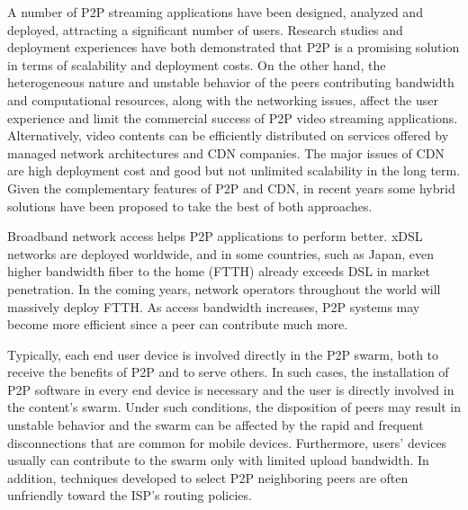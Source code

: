 \documentclass[conference]{IEEEtran}
\begin{document}
A number of P2P streaming applications have been designed, analyzed and deployed, attracting a significant number of users.  
Research studies and deployment experiences have both demonstrated that P2P is a promising solution in terms of scalability and deployment costs.  
On the other hand, the heterogeneous nature and unstable behavior of the peers contributing bandwidth and computational resources, along with the networking issues, affect the user experience and limit the commercial success of P2P video streaming applications.
Alternatively, video contents can be efficiently distributed on services offered by managed network architectures and CDN companies.
The major issues of CDN are high deployment cost and good but not unlimited scalability in the long term.  
Given the complementary features of P2P and CDN, in recent years some hybrid solutions have been proposed \cite{Huang:2008:UHC:1496046.1496064,4772628,Yin:2009:DDH:1631272.1631279} to take the best of both approaches.

Broadband network access helps P2P applications to perform better. xDSL networks are deployed worldwide, and in some countries, such as Japan, even higher bandwidth fiber to the home (FTTH) already exceeds DSL in market penetration. 
In the coming years, network operators throughout the world will massively deploy FTTH. 
As access bandwidth increases, P2P systems may become more efficient since a peer can contribute much more.

Typically, each end user device is involved directly in the P2P swarm, both to receive the benefits of P2P and to serve others.  
In such cases, the installation of P2P software in every end device is necessary and the user is directly involved in the content's swarm.
Under such conditions, the disposition of peers may result in unstable behavior and the swarm can be affected by the rapid and frequent disconnections that are common for mobile devices.  
Furthermore, users' devices usually can contribute to the swarm only with limited upload bandwidth.  
In addition, techniques developed to select P2P neighboring peers are often unfriendly toward the ISP's routing policies.
\end{document}
